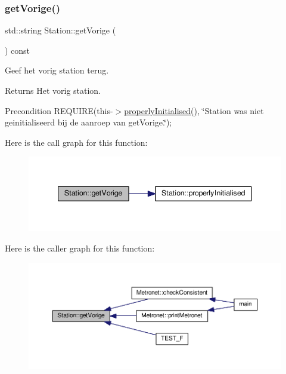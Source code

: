 \subsubsection{\texorpdfstring{get\+Vorige()}{getVorige()}}
{\footnotesize\ttfamily std\+::string Station\+::get\+Vorige (\begin{DoxyParamCaption}{ }\end{DoxyParamCaption}) const}



Geef het vorig station terug. 

\begin{DoxyReturn}{Returns}
Het vorig station. 
\end{DoxyReturn}
\begin{DoxyPrecond}{Precondition}
R\+E\+Q\+U\+I\+RE(this-\/$>$\hyperlink{class_station_a9ce626dd0599e3ea8107404a59c21e16}{properly\+Initialised()}, \char`\"{}\+Station was niet geinitialiseerd bij de aanroep van get\+Vorige.\char`\"{}); 
\end{DoxyPrecond}
Here is the call graph for this function\+:\nopagebreak
\begin{figure}[H]
\begin{center}
\leavevmode
\includegraphics[width=340pt]{class_station_a6776dd16c23da9f512d82883ea896fea_cgraph}
\end{center}
\end{figure}
Here is the caller graph for this function\+:\nopagebreak
\begin{figure}[H]
\begin{center}
\leavevmode
\includegraphics[width=350pt]{class_station_a6776dd16c23da9f512d82883ea896fea_icgraph}
\end{center}
\end{figure}
\mbox{\label{class_station_a9ce626dd0599e3ea8107404a59c21e16}} 
